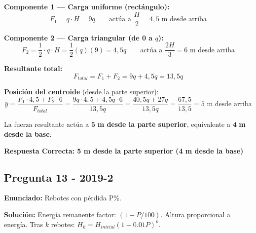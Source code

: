 \documentclass{article}
\begin{document}
\textbf{Componente 1 — Carga uniforme (rectángulo):}
\[
F_1 = q \cdot H = 9q \qquad \text{actúa a } \frac{H}{2} = 4{,}5 \text{ m desde arriba}
\]

\textbf{Componente 2 — Carga triangular (de 0 a $q$):}
\[
F_2 = \frac{1}{2} \cdot q \cdot H = \frac{1}{2}(q)(9) = 4{,}5q \qquad \text{actúa a } \frac{2H}{3} = 6 \text{ m desde arriba}
\]

\textbf{Resultante total:}
\[
F_{total} = F_1 + F_2 = 9q + 4{,}5q = 13{,}5q
\]

\textbf{Posición del centroide} (desde la parte superior):
\[
\bar{y} = \frac{F_1 \cdot 4{,}5 + F_2 \cdot 6}{F_{total}} = \frac{9q \cdot 4{,}5 + 4{,}5q \cdot 6}{13{,}5q} = \frac{40{,}5q + 27q}{13{,}5q} = \frac{67{,}5}{13{,}5} = 5 \text{ m desde arriba}
\]

La fuerza resultante actúa a $\mathbf{5}$ \textbf{m desde la parte superior}, equivalente a $\mathbf{4}$ \textbf{m desde la base}.

\noindent{}

\textbf{Respuesta Correcta: 5 m desde la parte superior (4 m desde la base)}

\vspace{0.5cm}

\subsection*{Pregunta 13 - 2019-2}
\textbf{Enunciado:} Rebotes con pérdida P\%.

\textbf{Solución:}
Energía remanente factor: $(1 - P/100)$.
Altura proporcional a energía.
Tras $k$ rebotes: $H_k = H_{inicial} (1 - 0.01 P)^k$.

\noindent{}
\end{document}
